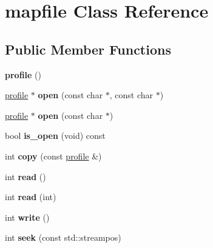 \hypertarget{classmapfile}{\section{mapfile Class Reference}
\label{classmapfile}
}
\subsection*{Public Member Functions}
\begin{DoxyCompactItemize}
\item 
\hypertarget{classmapfile_a0e073211cb6391569defd55c50c343b9}{{\bfseries profile} ()}\label{classmapfile_a0e073211cb6391569defd55c50c343b9}

\item 
\hypertarget{classmapfile_a77a2c4612bad0851a819259623be46ac}{\hyperlink{classprofile}{profile} $\ast$ {\bfseries open} (const char $\ast$, const char $\ast$)}\label{classmapfile_a77a2c4612bad0851a819259623be46ac}

\item 
\hypertarget{classmapfile_a92aa688f21fd3ed979b4e540afb1f9ce}{\hyperlink{classprofile}{profile} $\ast$ {\bfseries open} (const char $\ast$)}\label{classmapfile_a92aa688f21fd3ed979b4e540afb1f9ce}

\item 
\hypertarget{classmapfile_a7d382c404881268bc6efe6d094cab9a7}{bool {\bfseries is\-\_\-open} (void) const }\label{classmapfile_a7d382c404881268bc6efe6d094cab9a7}

\item 
\hypertarget{classmapfile_aa5ee33135015405d83c12427d9164f62}{int {\bfseries copy} (const \hyperlink{classprofile}{profile} \&)}\label{classmapfile_aa5ee33135015405d83c12427d9164f62}

\item 
\hypertarget{classmapfile_ae101f9a2e0a92d86afb1c39de1137b71}{int {\bfseries read} ()}\label{classmapfile_ae101f9a2e0a92d86afb1c39de1137b71}

\item 
\hypertarget{classmapfile_af2748619ab4a37758ff4dc29e2ba9cc2}{int {\bfseries read} (int)}\label{classmapfile_af2748619ab4a37758ff4dc29e2ba9cc2}

\item 
\hypertarget{classmapfile_a775b45ea005c4b35570b05055ce19004}{int {\bfseries write} ()}\label{classmapfile_a775b45ea005c4b35570b05055ce19004}

\item 
\hypertarget{classmapfile_a514b89e986b2737019c3b4964bac350c}{int {\bfseries seek} (const std\-::streampos)}\label{classmapfile_a514b89e986b2737019c3b4964bac350c}


\end{DoxyCompactItemize}
